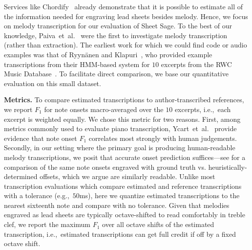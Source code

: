 \documentclass{article}
\begin{document}
Services like Chordify~\cite{de2014chordify} already demonstrate that it is possible to estimate all of the information needed for engraving lead sheets besides melody. 
Hence, we focus on melody transcription for our evaluation of Sheet Sage. 
To the best of our knowledge, 
Paiva~et~al.~\cite{paiva2005detection} were the first to investigate melody transcription (rather than extraction). 
The earliest work for which we could find code or audio examples was that of Ryyn{\"a}nen and Klapuri~\cite{ryynanen2008automatic}, 
who provided example transcriptions from their HMM-based system for $10$ excerpts from the RWC Music Database~\cite{goto2002rwc}. 
To facilitate direct comparison, 
we base our quantitative evaluation on this small dataset. 

\textbf{Metrics.} 
To compare estimated transcriptions to author-transcribed references, 
we report $F_1$ for note onsets macro-averaged over the $10$ excerpts, i.e.,~each excerpt is weighted equally. 
We chose this metric for two reasons. 
First, 
among metrics commonly used to evaluate piano transcription, 
Ycart~et~al.~\cite{ycart2020investigating} provide evidence that note onset $F_1$ correlates most strongly with human judgements. 
Secondly, 
in our setting where the primary goal is producing human-readable melody transcriptions, 
we posit that accurate onset prediction suffices---see  for a comparison of the same note onsets engraved with ground truth vs. heuristically-determined offsets, which we argue are similarly readable. 
Unlike most transcription evaluations which compare estimated and reference transcriptions with a tolerance (e.g.,~$50$ms), 
here we quantize estimated transcriptions to the nearest sixteenth note and compare with no tolerance. 
Given that melodies engraved as lead sheets are typically octave-shifted to read comfortably in treble clef, 
we report the maximum $F_1$ over all octave shifts of the estimated transcription, 
i.e.,~estimated transcriptions can get full credit if off by a fixed octave shift.

\newcommand{\tabquantrow}[9]{ #9 & #1 \\}
\end{document}

